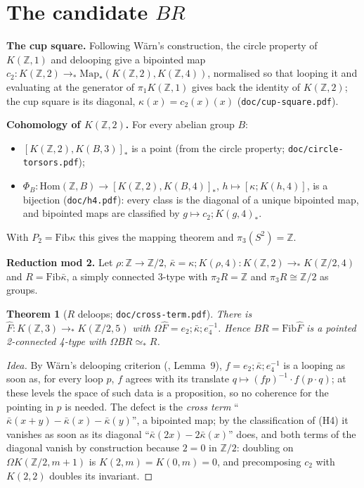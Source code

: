 \documentclass[11pt]{amsart}
\newtheorem{theorem}{Theorem}
\theoremstyle{definition}
\theoremstyle{remark}
\newcommand{\Om}{\Omega}
\newcommand{\Map}{\mathrm{Map}_*}
\newcommand{\Z}{\mathbb{Z}}
\newcommand{\code}[1]{\texttt{#1}}
\newcommand{\Hom}{\mathrm{Hom}}
\newcommand{\hc}[2]{[#1,#2]_*}
\newcommand{\Fib}{\mathrm{Fib}}
\newcommand{\cls}[1]{[#1]}
\newcommand{\kb}{\bar\kappa}
\newcommand{\Fh}{\hat F}
\begin{document}
\section{The candidate $BR$}

\noindent\textbf{The cup square.} Following W\"arn's construction, the circle property
of $K(\Z,1)$ and delooping give a bipointed map $c_2:K(\Z,2)\to_*\Map(K(\Z,2),K(\Z,4))$,
normalised so that looping it and evaluating at the generator of $\pi_1K(\Z,1)$ gives
back the identity of $K(\Z,2)$; the cup square is its diagonal, $\kappa(x)=c_2(x)(x)$
(\code{doc/cup-square.pdf}).

\noindent\textbf{Cohomology of $K(\Z,2)$.} For every abelian group $B$:
\begin{itemize}
\item[(H3)] $\hc{K(\Z,2)}{K(B,3)}$ is a point (from the circle property;
  \code{doc/circle-torsors.pdf});
\item[(H4)] $\Phi_B:\Hom(\Z,B)\to\hc{K(\Z,2)}{K(B,4)}$,
  $h\mapsto\cls{\kappa;K(h,4)}$, is a bijection (\code{doc/h4.pdf}): every class is the
  diagonal of a unique bipointed map, and bipointed maps are classified by
  $g\mapsto c_2;K(g,4)_*$.
\end{itemize}
With $P_2=\Fib\kappa$ this gives the mapping theorem and $\pi_3(S^2)=\Z$.

\noindent\textbf{Reduction mod 2.} Let $\rho:\Z\to\Z/2$, $\kb=\kappa;K(\rho,4):K(\Z,2)\to_*
K(\Z/2,4)$ and $R=\Fib\kb$, a simply connected 3-type with $\pi_2R=\Z$ and
$\pi_3R\cong\Z/2$ as groups.

\begin{theorem}[$R$ deloops; \code{doc/cross-term.pdf}]\label{t:deloop}
There is $\Fh:K(\Z,3)\to_*K(\Z/2,5)$ with $\Om\Fh=e_2;\kb;e_4^{-1}$. Hence
$BR=\Fib\Fh$ is a pointed 2-connected 4-type with $\Om BR\simeq_*R$.
\end{theorem}
\begin{proof}[Idea]
By W\"arn's delooping criterion (\cite{DW1}, Lemma~9), $f=e_2;\kb;e_4^{-1}$ is a looping
as soon as, for every loop $p$, $f$ agrees with its translate $q\mapsto(fp)^{-1}\cdot f(p\cdot q)$;
at these levels the space of such data is a proposition, so no coherence for the
pointing in $p$ is needed. The defect is the \emph{cross term}
``$\kb(x+y)-\kb(x)-\kb(y)$'', a bipointed map; by the classification of (H4) it
vanishes as soon as its diagonal ``$\kb(2x)-2\kb(x)$'' does, and both terms of the
diagonal vanish by construction because $2=0$ in $\Z/2$: doubling on
$\Om K(\Z/2,m{+}1)$ is $K(2,m)=K(0,m)=0$, and precomposing $c_2$ with $K(2,2)$ doubles
its invariant.
\end{proof}
\end{document}
